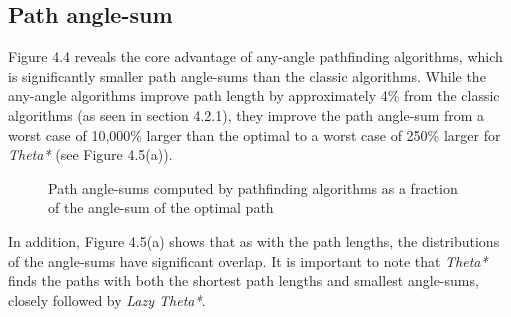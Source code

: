 \documentclass[12pt,notitlepage]{report}
\begin{document}
\subsection{Path angle-sum}

Figure 4.4 reveals the core advantage of any-angle pathfinding algorithms, which is significantly smaller path angle-sums than the classic algorithms. While the any-angle algorithms improve path length by approximately 4\% from the classic algorithms (as seen in section 4.2.1), they improve the path angle-sum from a worst case of 10,000\% larger than the optimal to a worst case of 250\% larger for {\em Theta*} (see Figure 4.5(a)).\\

\begin{figure}
\centering

\caption[Path angle-sums computed by pathfinding algorithms]{Path angle-sums computed by pathfinding algorithms as a fraction of the angle-sum of the optimal path}
\end{figure}

\noindent
In addition, Figure 4.5(a) shows that as with the path lengths, the distributions of the angle-sums have significant overlap. It is important to note that {\em Theta*} finds the paths with both the shortest path lengths and smallest angle-sums, closely followed by {\em Lazy Theta*}.\\
\end{document}
